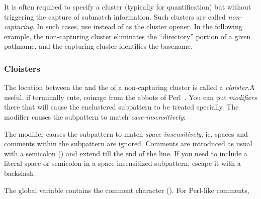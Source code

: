 {It is often required to specify a cluster
(typically for quantification) but without triggering
the capture of submatch information.  Such
clusters are called {\em non-capturing}.  In such cases,
use  instead of \p{(} as the cluster opener.  In
the following example, the  non-capturing cluster
eliminates the ``directory'' portion of a given
pathname, and the capturing cluster  identifies the
basename.


\subsubsection{Cloisters}

The location between the  and the \p{:} of a
non-capturing cluster is called a {\em cloister}.\f{A
useful, if terminally cute, coinage from the abbots of
Perl~.}  You can put {\em modifiers}
there that will cause the enclustered subpattern to be
treated specially.  The modifier  causes the
subpattern to match {\em case-insensitively}:


The modifier  causes the subpattern to match
{\em space-insensitively}, ie, spaces and
comments within the
subpattern are ignored.  Comments are introduced
as usual with a semicolon (\p{;}) and extend till
the end of the line.  If you need
to include a literal space or semicolon in
a space-insensitized subpattern, escape it
with a backslash.


\n The global variable 
contains the comment character (\q{#\;}).
For Perl-like comments,

}
